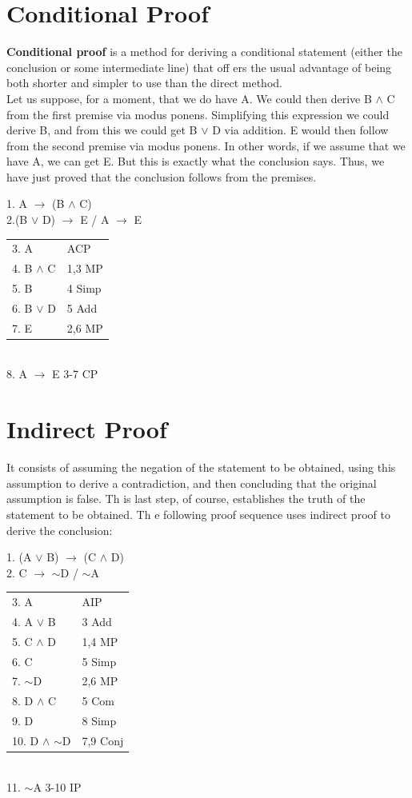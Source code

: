 \documentclass[a4paper,oneside]{book}
\begin{document}
\section{Conditional Proof}
\textbf{Conditional proof} is a method for deriving a conditional statement (either the conclusion
or some intermediate line) that off ers the usual advantage of being both shorter
and simpler to use than the direct method.\\
\indent Let us suppose, for a moment, that
we do have A. We could then derive B $\wedge$ C from the first premise via modus ponens.
Simplifying this expression we could derive B, and from this we could get B $\lor$ D via
addition. E would then follow from the second premise via modus ponens. In other
words, if we assume that we have A, we can get E. But this is exactly what the conclusion
says. Thus, we have just proved that the conclusion follows from the premises.\\
\begin{center}
1. A $\to$ (B $\wedge$ C)\\
2.(B $\lor$ D) $\to$ E / A $\to$ E\\
 \begin{tabular}[H]{|ll}
  3. A & ACP \\
  4. B $\wedge$ C & 1,3  MP\\
  5. B & 4 Simp \\
  6. B $\lor$ D & 5 Add \\
  7. E & 2,6 MP \\
 \end{tabular}
\\8. A $\to$ E   3-7 CP
\end{center}
\section{Indirect Proof}
It consists of assuming the negation of the statement to be obtained, using
this assumption to derive a contradiction, and then concluding that the original assumption is false. Th is last step, of course, establishes the truth of the statement to be
obtained. Th e following proof sequence uses indirect proof to derive the conclusion:\\
\begin{center}
1. (A $\lor$ B) $\to$ (C $\wedge$ D)\\
2. C $\to$ $\sim$D / $\sim$A\\
\begin{tabular}[H]{|ll}
3. A & AIP \\ 
4. A $\lor$ B & 3 Add\\
5. C $\wedge$ D & 1,4 MP\\
6. C & 5 Simp\\
7. $\sim$D & 2,6 MP\\
8. D $\wedge$ C & 5 Com\\
9. D & 8 Simp\\
10. D $\wedge$ $\sim$D & 7,9 Conj\\
\end{tabular}
\\11. $\sim$A 3-10 IP
\end{center}
\end{document}
